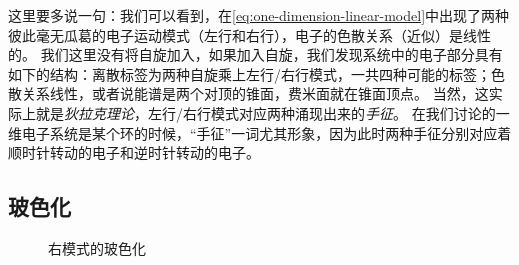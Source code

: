 这里要多说一句：我们可以看到，在\eqref{eq:one-dimension-linear-model}中出现了两种彼此毫无瓜葛的电子运动模式（左行和右行），电子的色散关系（近似）是线性的。
我们这里没有将自旋加入，如果加入自旋，我们发现系统中的电子部分具有如下的结构：离散标签为两种自旋乘上左行/右行模式，一共四种可能的标签；色散关系线性，或者说能谱是两个对顶的锥面，费米面就在锥面顶点。
当然，这实际上就是\emph{狄拉克理论}，左行/右行模式对应两种涌现出来的\emph{手征}。
在我们讨论的一维电子系统是某个环的时候，“手征”一词尤其形象，因为此时两种手征分别对应着顺时针转动的电子和逆时针转动的电子。

\subsection{玻色化}

\begin{figure}
    \subfigure[基态]{
        
    }
    \caption{右模式的玻色化}
\end{figure}

